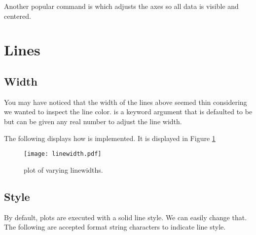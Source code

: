 Another popular command is  which adjusts the axes so all data is visible and centered. 

\section*{Lines}
\subsection*{Width}
You may have noticed that the width of the lines above seemed thin considering we wanted to inspect the line color.  is a keyword argument that is defaulted to be  but can be given any real number to adjust the line width. 

The following displays how  is implemented. It is displayed in Figure \ref{linewidth}


\begin{figure} 
\texttt{[image: linewidth.pdf]}
\caption{plot of varying linewidths.}
\label{linewidth} 
\end{figure}

\subsection*{Style}
By default, plots are executed with a solid line style. We can easily change that. The following are accepted format string characters to indicate line style. 

